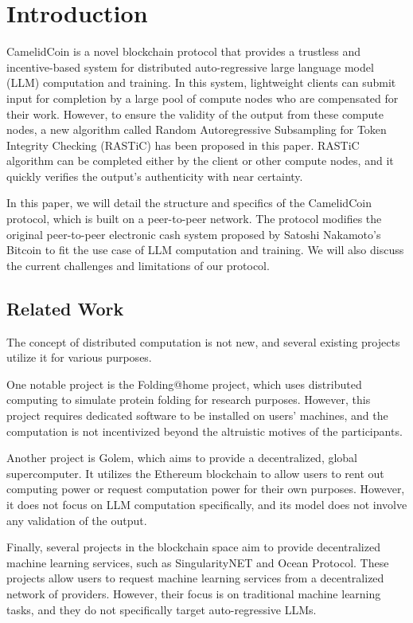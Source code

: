 \documentclass{article}
\begin{document}
\newpage
\tableofcontents
\newpage

\section{Introduction}
CamelidCoin is a novel blockchain protocol that provides a trustless and incentive-based system for distributed auto-regressive large language model (LLM) computation and training. 
In this system, lightweight clients can submit input for completion by a large pool of compute nodes who are compensated for their work. 
However, to ensure the validity of the output from these compute nodes, a new algorithm called Random Autoregressive Subsampling for Token Integrity Checking (RASTiC) has been proposed in this paper. 
RASTiC algorithm can be completed either by the client or other compute nodes, and it quickly verifies the output's authenticity with near certainty.

In this paper, we will detail the structure and specifics of the CamelidCoin protocol, which is built on a peer-to-peer network. 
The protocol modifies the original peer-to-peer electronic cash system proposed by Satoshi Nakamoto's Bitcoin to fit the use case of LLM computation and training. 
We will also discuss the current challenges and limitations of our protocol.

\subsection{Related Work}
The concept of distributed computation is not new, and several existing projects utilize it for various purposes.

One notable project is the Folding@home project, which uses distributed computing to simulate protein folding for research purposes.
However, this project requires dedicated software to be installed on users' machines, and the computation is not incentivized beyond the altruistic motives of the participants.

Another project is Golem, which aims to provide a decentralized, global supercomputer.
It utilizes the Ethereum blockchain to allow users to rent out computing power or request computation power for their own purposes.
However, it does not focus on LLM computation specifically, and its model does not involve any validation of the output.

Finally, several projects in the blockchain space aim to provide decentralized machine learning services, such as SingularityNET and Ocean Protocol.
These projects allow users to request machine learning services from a decentralized network of providers.
However, their focus is on traditional machine learning tasks, and they do not specifically target auto-regressive LLMs.
\end{document}

